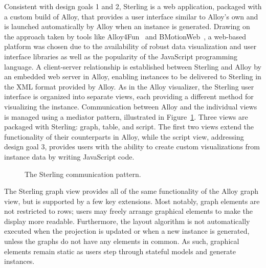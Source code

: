 \documentclass[runningheads]{llncs}
\newcommand{\dummyfigsmall}[1]{
  \centering
  \fbox{
    \begin{minipage}[c][0.15\textheight][c]{0.5\textwidth}
      \centering{#1}
    \end{minipage}
  }
}
\begin{document}
Consistent with design goals 1 and 2, Sterling is a web application, packaged with a custom build of Alloy, that provides a user interface similar to Alloy's own and is launched automatically by Alloy when an instance is generated. 
Drawing on the approach taken by tools like Alloy4Fun~\cite{macedo2019} and BMotionWeb~\cite{ladenberger2016}, a web-based platform was chosen due to the availability of robust data visualization and user interface libraries as well as the popularity of the JavaScript programming language.
A client-server relationship is established between Sterling and Alloy by an embedded web server in Alloy, enabling instances to be delivered to Sterling in the XML format provided by Alloy. 
As in the Alloy visualizer, the Sterling user interface is organized into separate views, each providing a different method for visualizing the instance. 
Communication between Alloy and the individual views is managed using a mediator pattern, illustrated in Figure~\ref{fig:communication}. Three views are packaged with Sterling: graph, table, and script. The first two views extend the functionality of their counterparts in Alloy, while the script view, addressing design goal 3, provides users with the ability to create custom visualizations from instance data by writing JavaScript code.

\begin{figure}
    \centering
    \dummyfigsmall{Communication pattern image.}
    \caption{The Sterling communication pattern.}
    \label{fig:communication}
\end{figure}


The Sterling graph view provides all of the same functionality of the Alloy graph view, but is supported by a few key extensions. Most notably, graph elements are not restricted to rows; users may freely arrange graphical elements to make the display more readable. Furthermore, the layout algorithm is not automatically executed when the projection is updated or when a new instance is generated, unless the graphs do not have any elements in common. As such, graphical elements remain static as users step through stateful models and generate instances.
\end{document}
